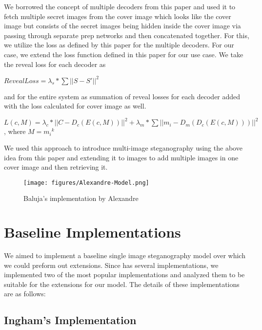 \documentclass{article}
\begin{document}
We borrowed the concept of multiple decoders from this paper and used it to fetch multiple secret images from the cover image which looks like the cover image but consists of the secret images being hidden inside the cover image via passing through separate prep networks and then concatenated together. For this, we utilize the loss as defined by this paper for the multiple decoders. For our case, we extend the loss function defined in this paper for our use case. We take the reveal loss for each decoder as
\begin{center}
$Reveal Loss = \lambda_s*\sum||S- S'||^2$
\end{center}
and for the entire system as summation of reveal losses for each decoder added with the loss calculated for cover image as well.

$L(c,M) = \lambda_c*||C - D_c(E(c,M))||^2 + \lambda_m*\sum||m_i - D_m(D_c(E(c,M)))||^2$
, where $ M= {m_i}^k$

We used this approach to introduce multi-image steganography using the above idea from this paper and extending it to images to add multiple images in one cover image and then retrieving it.


\begin{figure*}
\vskip 0.2in
\begin{center}
\centerline{\texttt{[image: figures/Alexandre-Model.png]}}
\caption{Baluja's implementation by Alexandre}
\label{fig:Alexandre_arch}
\end{center}
\vskip -0.4in
\end{figure*}

\section{Baseline Implementations}

We aimed to implement a baseline single image steganography model over which we could preform out extensions. Since \cite{NIPS2017_6802} has several implementations, we implemented two of the most popular implementations and analyzed them to be suitable for the extensions for our model. The details of these implementations are as follows:

\subsection{{Ingham's Implementation}}
\end{document}
